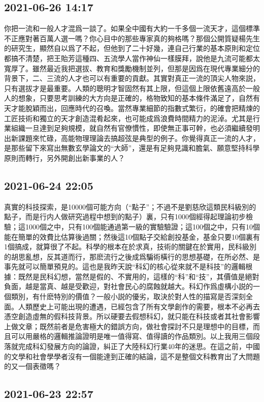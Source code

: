 \documentclass[twocolumn]{ctexart}
\begin{document}
\subsection*{2021-06-26 14:17}
你把一流和一般人才混爲一談了。如果全中國有大約一千多個一流天才，這個標準不正應對著百萬人選一嗎？你心目中的那些專家真的夠格嗎？那個公開質疑楊先生的研究生，顯然自以爲了不起，但他到了二十好幾，連自己行業的基本原則和定位都搞不清楚，把王貽芳這種四、五流學人當作神仙一樣膜拜，說他是九流可能都太寬厚了。雖然最近我把選拔、教育和獎勵機制並列，但那是因爲在現代專業細分的背景下，二、三流的人才也可以有重要的貢獻。其實對真正一流的頂尖人物來説，只有選拔才是最重要。人類的聰明才智固然有其上限，但這個上限依舊遠高於一般人的想象，只要思考訓練的大方向是正確的，格物致知的基本條件滿足了，自然有天才能脫穎而出，回應時代的召喚。當然專業細節的指數式繁衍，的確會把精煉的工匠技術和獨立的天才創造混肴起來，也可能成爲浪費時間精力的泥淖。尤其是行業組織一旦達到足夠規模，就自然有官僚慣性，即使無正事可幹，也必須繼續發明出新課題來忙碌，高能物理理論去搞超弦是典型的例子。你覺得真正一流的人才，是那些留下來寫出無數玄學論文的“大師”，還是有足夠見識和膽氣、願意堅持科學原則而轉行，另外開創出新事業的人？\subsection*{2021-06-24 22:05}
真實的科技探索，是10000個可能方向（“點子”；不過不是劉慈欣這類民科級別的點子，而是行内人做研究過程中想到的點子）裏，只有1000個經得起理論初步檢驗；這1000個之中，只有100個能通過第一級的實驗驗證；這100個之中，只有10個能在簡單的效費比估算後過關；然後這10個點子交給創投基金，基金只要10個裏有1個搞成，就算很了不起。科學的根本在於求真，技術的關鍵在於實用，民科級別的胡思亂想，反其道而行，那麽流行之後成爲騙術橫行的思想基礎，在所必然、是事先就可以簡單預見的。這也是我昨天說“科幻的核心從來就不是科技”的邏輯根據：既然是民科幻想，當然是假的、不實用的，這樣的“科”和“技”，其價值是絕對負面，越是當真、越是受歡迎，對社會民心的腐蝕就越大。科幻作爲虛構小説的一個類別，有什麽特別的價值？一般小説的優劣，取決於對人性的描寫是否深刻全面。人類歷史上可能出現的遭遇，已經包含了所有文學創作的需要，根本不必再去憑空創造虛無的假科技背景。所以硬要去假想科幻，就只能在科技或者其社會影響上做文章；既然前者是危害極大的錯誤方向，做社會探討不只是理想中的目標，而且可以用嚴格的邏輯推論證明是唯一值得寫、值得讀的作品類別。以上我用三個段落就完成科幻發展方向的論證，糾正了大陸科幻行業40年的迷思。在這之前，中國的文學和社會學學者沒有一個能達到正確的結論，這不是整個文科教育出了大問題的又一個表徵嗎？\subsection*{2021-06-23 22:57}
\end{document}
